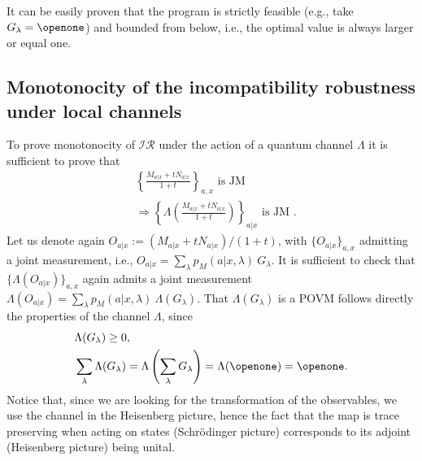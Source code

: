 \documentclass[10pt,twocolumn,aps,prl,nobibnotes,showpacs,superscriptaddress,floatfix]{revtex4-1}
\theoremstyle{definition}
\begin{document}
It can be easily proven that the program is strictly feasible (e.g., take $G_\lambda=\openone$) and bounded from below, i.e., the optimal value is 
always larger or equal one.

\subsection{Monotonocity of the incompatibility robustness under local channels}
To prove monotonocity of $\mathcal{IR}$ under the action of a quantum channel $\Lambda$ it is sufficient to prove that
\begin{equation}
\begin{split}
&\left\lbrace \frac{M_{a|x} + t N_{a|x}}{1+t}\right\rbrace_{a,x} \text{ is JM } \\
&\Longrightarrow \left\lbrace\Lambda \left( \frac{M_{a|x} + t N_{a|x}}{1+t}\right)\right\rbrace_{a|x}\text{ is JM }.
\end{split}
\end{equation}
Let us denote again $O_{a|x} := (M_{a|x} + t N_{a|x})/(1+t)$, with $\{O_{a|x}\}_{a,x}$ admitting a joint measurement, i.e., ${O_{a|x}=\sum_\lambda p_M(a|x,\lambda)\ G_\lambda}$. It is sufficient to check that $\{ \Lambda(O_{a|x})\}_{a,x}$ again admits a joint measurement ${\Lambda(O_{a|x})=\sum_\lambda p_M(a|x,\lambda)\ \Lambda(G_\lambda)}$. That $\Lambda(G_\lambda)$ is a POVM follows directly the properties of the channel $\Lambda$, since 
\begin{equation}
\begin{split}
&\Lambda(G_\lambda)\geq 0,\\ 
&\sum_\lambda \Lambda(G_\lambda)=\Lambda\left(\sum_\lambda G_\lambda\right)=\Lambda(\openone)=\openone.
\end{split}
\end{equation} 
Notice that, since we are looking for the transformation of the observables, we use the channel in the Heisenberg picture, hence the fact that the map is trace preserving when acting on states (Schr\"odinger picture) corresponds to its adjoint (Heisenberg picture) being unital.

%
{}
\end{document}
